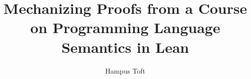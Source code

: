 \documentclass[11pt,titlepage,oneside,a4paper]{book}
\title{Mechanizing Proofs from a Course on Programming Language Semantics in Lean}
\author{Hampus Toft}
\subtitle{} %
\begin{document}
\frontmatter

\makeuufrontmatter



\tableofcontents




\mainmatter















\printbibliography

\appendix



% 

% 

% 
\end{document}
